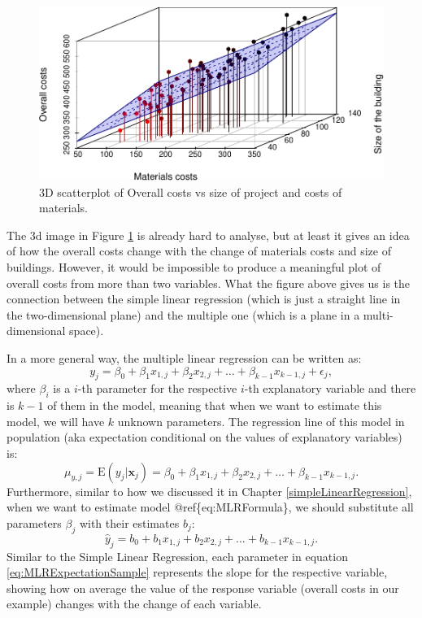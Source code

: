 \documentclass[
]{book}
\theoremstyle{definition}
\theoremstyle{definition}
\theoremstyle{definition}
\theoremstyle{definition}
\theoremstyle{remark}
\begin{document}
\begin{figure}
\centering
\includegraphics{Svetunkov---Statistics-for-Business-Analytics_files/figure-latex/scatterplot3dProjectCosts-1.pdf}
\caption{\label{fig:scatterplot3dProjectCosts}3D scatterplot of Overall costs vs size of project and costs of materials.}
\end{figure}

The 3d image in Figure \ref{fig:scatterplot3dProjectCosts} is already hard to analyse, but at least it gives an idea of how the overall costs change with the change of materials costs and size of buildings. However, it would be impossible to produce a meaningful plot of overall costs from more than two variables. What the figure above gives us is the connection between the simple linear regression (which is just a straight line in the two-dimensional plane) and the multiple one (which is a plane in a multi-dimensional space).

In a more general way, the multiple linear regression can be written as:
\begin{equation}
    y_j = \beta_0 + \beta_1 x_{1,j} + \beta_2 x_{2,j} + \dots + \beta_{k-1} x_{k-1,j} + \epsilon_j ,
    \label{eq:MLRFormula}
\end{equation}
where \(\beta_i\) is a \(i\)-th parameter for the respective \(i\)-th explanatory variable and there is \(k-1\) of them in the model, meaning that when we want to estimate this model, we will have \(k\) unknown parameters. The regression line of this model in population (aka expectation conditional on the values of explanatory variables) is:
\begin{equation}
    \mu_{y,j} = \mathrm{E}(y_j | \mathbf{x}_j) = \beta_0 + \beta_1 x_{1,j} + \beta_2 x_{2,j} + \dots + \beta_{k-1} x_{k-1,j} .
    \label{eq:MLRExpectation}
\end{equation}
Furthermore, similar to how we discussed it in Chapter \ref{simpleLinearRegression}, when we want to estimate model @ref\{eq:MLRFormula\}, we should substitute all parameters \(\beta_j\) with their estimates \(b_j\):
\begin{equation}
    \hat{y}_j = b_0 + b_1 x_{1,j} + b_2 x_{2,j} + \dots + b_{k-1} x_{k-1,j} .
    \label{eq:MLRExpectationSample}
\end{equation}
Similar to the Simple Linear Regression, each parameter in equation \eqref{eq:MLRExpectationSample} represents the slope for the respective variable, showing how on average the value of the response variable (overall costs in our example) changes with the change of each variable.
\end{document}
